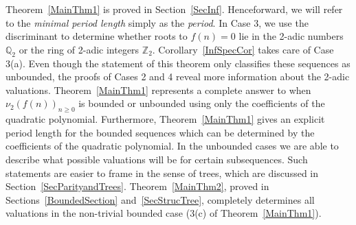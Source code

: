 \documentclass[12pt]{article}
\begin{document}
Theorem~\ref{MainThm1} is proved in Section~\ref{SecInf}. Henceforward, we will refer to the \textit{minimal period length} simply as the \textit{period}. In Case 3, we use the discriminant to determine whether roots to $f(n)=0$ lie in the 2-adic numbers $\mathbb{Q}_2$ or the ring of 2-adic integers $\mathbb{Z}_2$. Corollary~\ref{InfSpecCor} takes care of Case 3(a). Even though the statement of this theorem only classifies these sequences as unbounded, the proofs of Cases 2 and 4 reveal more information about the 2-adic valuations. Theorem~\ref{MainThm1} represents a complete answer to when $\nu_{2}(f(n))_{n\geq0}$ is bounded or unbounded using only the coefficients of the quadratic polynomial. Furthermore, Theorem~\ref{MainThm1} gives an explicit period length for the bounded sequences which can be determined by the coefficients of the quadratic polynomial. In the unbounded cases we are able to describe what possible valuations will be for certain subsequences. Such statements are easier to frame in the sense of trees, which are discussed in Section~\ref{SecParityandTrees}. Theorem~\ref{MainThm2}, proved in Sections~\ref{BoundedSection} and~\ref{SecStrucTree}, completely determines all valuations in the non-trivial bounded case (3(c) of Theorem~\ref{MainThm1}).
\end{document}
